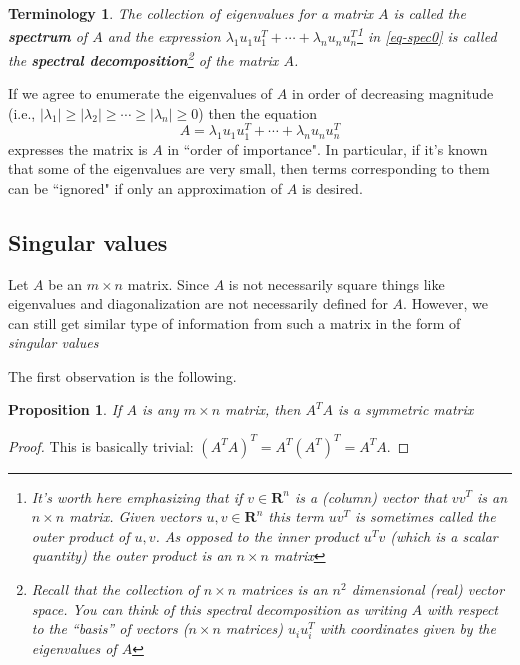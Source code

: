 \documentclass[12pt]{article}
\numberwithin{equation}{subsection}
\numberwithin{figure}{subsection}
\newtheorem{prop}[subsection]{Proposition}
\theoremstyle{note}
\newtheorem{terminology}[subsection]{Terminology}
\newcommand{\R}{\mathbf{R}}
\begin{document}
\begin{terminology} The collection of eigenvalues for a matrix $A$ is called the \textbf{spectrum} of $A$ and the expression $\lambda_1 u_1u_1^T + \cdots + \lambda_n u_nu_n^T$\footnote{It's worth here emphasizing that if $v\in \R^n$ is a (column) vector that $vv^T$ is an $n\times n$ matrix. Given vectors $u,v\in \R^n$ this term $uv^T$ is sometimes called the \textit{outer product} of $u,v$. As opposed to the \textit{inner product} $u^Tv$ (which is a scalar quantity) the outer product is an $n\times n$ matrix} in \eqref{eq-spec0} is called the \textbf{spectral decomposition}\footnote{Recall that the collection of $n\times n$ matrices is an $n^2$ dimensional (real) vector space. You can think of this spectral decomposition as writing $A$ with respect to the ``basis'' of vectors ($n\times n$ matrices) $u_iu_i^T$ with coordinates given by the eigenvalues of $A$} of the matrix $A$.\end{terminology}

If we agree to enumerate the eigenvalues of $A$ in order of decreasing magnitude  (i.e., $|\lambda_1|\geq |\lambda_2|\geq \cdots\geq |\lambda_n|\geq 0$) then the equation \begin{equation}\label{eq-spec} A=\lambda_1 u_1u_1^T + \cdots + \lambda_n u_nu_n^T\end{equation} 
expresses the matrix is $A$ in ``order of importance". In particular, if it's known that some of the eigenvalues are very small, then terms corresponding to them can be ``ignored" if only an approximation of $A$ is desired. 


\subsection{Singular values}
Let $A$ be an $m\times n$ matrix. Since $A$ is not necessarily square things like eigenvalues and diagonalization are not necessarily defined for $A$. However, we can still get similar type of information from such a matrix in the form of \textit{singular values}

The first observation is the following. 
\begin{prop} If $A$ is any $m\times n$ matrix, then $A^TA$ is a symmetric matrix 
\end{prop}
\begin{proof} This is basically trivial: $(A^TA)^T=A^T(A^T)^T=A^TA$.
\end{proof}
\end{document}
